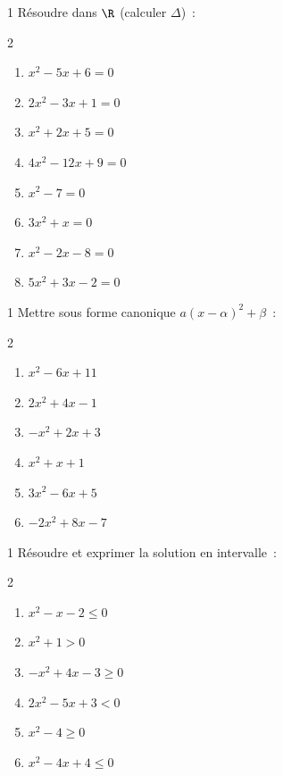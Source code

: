 \begin{exo}{1}
R\'esoudre dans $\R$ (calculer $\Delta$)~:
\begin{multicols}{2}
\begin{enumerate}
  \item $x^2 - 5x + 6 = 0$
  \item $2x^2 - 3x + 1 = 0$
  \item $x^2 + 2x + 5 = 0$
  \item $4x^2 - 12x + 9 = 0$
  \item $x^2 - 7 = 0$
  \item $3x^2 + x = 0$
  \item $x^2 - 2x - 8 = 0$
  \item $5x^2 + 3x - 2 = 0$
\end{enumerate}
\end{multicols}
\end{exo}

\begin{exo}{1}
Mettre sous forme canonique $a(x-\alpha)^2+\beta$~:
\begin{multicols}{2}
\begin{enumerate}
  \item $x^2 - 6x + 11$
  \item $2x^2 + 4x - 1$
  \item $-x^2 + 2x + 3$
  \item $x^2 + x + 1$
  \item $3x^2 - 6x + 5$
  \item $-2x^2 + 8x - 7$
\end{enumerate}
\end{multicols}
\end{exo}

\begin{exo}{1}
R\'esoudre et exprimer la solution en intervalle~:
\begin{multicols}{2}
\begin{enumerate}
  \item $x^2 - x - 2 \leq 0$
  \item $x^2 + 1 > 0$
  \item $-x^2 + 4x - 3 \geq 0$
  \item $2x^2 - 5x + 3 < 0$
  \item $x^2 - 4 \geq 0$
  \item $x^2 - 4x + 4 \leq 0$
\end{enumerate}
\end{multicols}
\end{exo}

